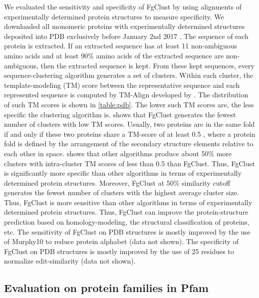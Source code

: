 \documentclass[11pt,letterpaper]{article}
\begin{document}
We evaluated the sensitivity and specificity of FgClust by using alignments of experimentally determined protein structures to measure specificity.
We downloaded all monomeric proteins with experimentally determined structures deposited into PDB exclusively before January 2nd 2017 \citep{berman2006protein}.
The sequence of each protein is extracted.
If an extracted sequence has at least 11 non-ambiguous amino acids and at least 90\% amino acids of the extracted sequence are non-ambiguous, then the extracted sequence is kept.
From these kept sequences, every sequence-clustering algorithm generates a set of clusters.
Within each cluster, the template-modeling (TM) score between the representative sequence and each represented sequence is computed by TM-Align developed by \citet{zhang2005tm}.
The distribution of such TM scores is shown in \cref{table:pdb}.
The lower such TM scores are, the less specific the clustering algorithm is.
 shows that FgClust generates the fewest number of clusters with low TM scores.
Usually, two proteins are in the same fold if and only if these two proteins share a TM-score of at least 0.5 \citep{xu2010significant}, where a protein fold is defined by the arrangement of the secondary structure elements relative to each other in space.
 shows that other algorithms produce about 50\% more clusters with intra-cluster TM scores of less than 0.5 than FgClust.
Thus, FgClust is significantly more specific than other algorithms in terms of experimentally determined protein structures.
Moreover, FgClust at 50\% similarity cutoff generates the fewest number of clusters with the highest average cluster size.
Thus, FgClust is more sensitive than other algorithms in terms of experimentally determined protein structures.
Thus, FgClust can improve the protein-structure prediction based on homology-modeling, the structural classification of proteins, etc.
The sensitivity of FgClust on PDB structures is mostly improved by the use of Murphy10 to reduce protein alphabet (data not shown).
The specificity of FgClust on PDB structures is mostly improved by the use of 25 residues to normalize edit-similarity (data not shown).

\subsection{Evaluation on protein families in Pfam}
\end{document}
